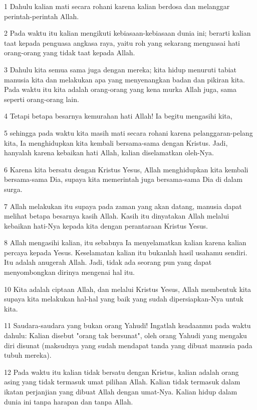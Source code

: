 \par 1 Dahulu kalian mati secara rohani karena kalian berdosa dan melanggar perintah-perintah Allah.
\par 2 Pada waktu itu kalian mengikuti kebiasaan-kebiasaan dunia ini; berarti kalian taat kepada penguasa angkasa raya, yaitu roh yang sekarang menguasai hati orang-orang yang tidak taat kepada Allah.
\par 3 Dahulu kita semua sama juga dengan mereka; kita hidup menuruti tabiat manusia kita dan melakukan apa yang menyenangkan badan dan pikiran kita. Pada waktu itu kita adalah orang-orang yang kena murka Allah juga, sama seperti orang-orang lain.
\par 4 Tetapi betapa besarnya kemurahan hati Allah! Ia begitu mengasihi kita,
\par 5 sehingga pada waktu kita masih mati secara rohani karena pelanggaran-pelang kita, Ia menghidupkan kita kembali bersama-sama dengan Kristus. Jadi, hanyalah karena kebaikan hati Allah, kalian diselamatkan oleh-Nya.
\par 6 Karena kita bersatu dengan Kristus Yesus, Allah menghidupkan kita kembali bersama-sama Dia, supaya kita memerintah juga bersama-sama Dia di dalam surga.
\par 7 Allah melakukan itu supaya pada zaman yang akan datang, manusia dapat melihat betapa besarnya kasih Allah. Kasih itu dinyatakan Allah melalui kebaikan hati-Nya kepada kita dengan perantaraan Kristus Yesus.
\par 8 Allah mengasihi kalian, itu sebabnya Ia menyelamatkan kalian karena kalian percaya kepada Yesus. Keselamatan kalian itu bukanlah hasil usahamu sendiri. Itu adalah anugerah Allah. Jadi, tidak ada seorang pun yang dapat menyombongkan dirinya mengenai hal itu.
\par 10 Kita adalah ciptaan Allah, dan melalui Kristus Yesus, Allah membentuk kita supaya kita melakukan hal-hal yang baik yang sudah dipersiapkan-Nya untuk kita.
\par 11 Saudara-saudara yang bukan orang Yahudi! Ingatlah keadaanmu pada waktu dahulu: Kalian disebut "orang tak bersunat", oleh orang Yahudi yang mengaku diri disunat (maksudnya yang sudah mendapat tanda yang dibuat manusia pada tubuh mereka).
\par 12 Pada waktu itu kalian tidak bersatu dengan Kristus, kalian adalah orang asing yang tidak termasuk umat pilihan Allah. Kalian tidak termasuk dalam ikatan perjanjian yang dibuat Allah dengan umat-Nya. Kalian hidup dalam dunia ini tanpa harapan dan tanpa Allah.
